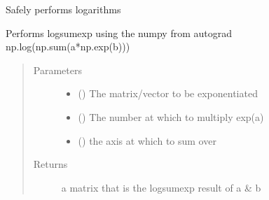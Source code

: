 \documentclass[letterpaper,10pt,english]{sphinxmanual}
\begin{document}

\begin{fulllineitems}
\label{\detokenize{wham.lib:wham.lib.numeric.safe_log}}
Safely performs logarithms

\end{fulllineitems}


\begin{fulllineitems}
\label{\detokenize{wham.lib:wham.lib.numeric.autograd_logsumexp}}
Performs logsumexp using the numpy from autograd
np.log(np.sum(a*np.exp(b)))
\begin{quote}\begin{description}
\item[{Parameters}] \leavevmode\begin{itemize}
\item {} 
 () \textendash{} The matrix/vector to be exponentiated

\item {} 
 () \textendash{} The number at which to multiply exp(a)

\item {} 
 () \textendash{} the axis at which to sum over

\end{itemize}

\item[{Returns}] \leavevmode
a matrix that is the logsumexp result of a \& b

\end{description}\end{quote}

\end{fulllineitems}
\end{document}

